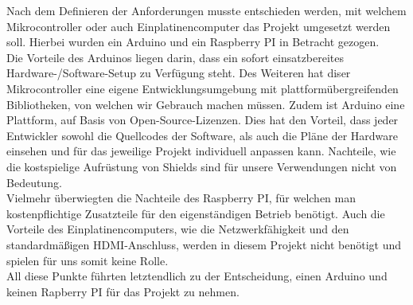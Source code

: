 \label{arduinovsRasbPI}

Nach dem Definieren der Anforderungen musste entschieden werden, mit welchem Mikrocontroller oder auch Einplatinencomputer das Projekt umgesetzt werden soll. Hierbei wurden ein Arduino und ein Raspberry PI in Betracht gezogen. \\
Die Vorteile des Arduinos liegen darin, dass ein sofort einsatzbereites Hardware-/Software-Setup zu Verfügung steht. Des Weiteren hat diser Mikrocontroller eine eigene Entwicklungsumgebung mit plattformübergreifenden Bibliotheken, von welchen wir Gebrauch machen müssen. Zudem ist Arduino eine Plattform, auf Basis von Open-Source-Lizenzen. Dies hat den Vorteil, dass jeder Entwickler sowohl die Quellcodes der Software, als auch die Pläne der Hardware einsehen und für das jeweilige Projekt individuell anpassen kann. \cite[vgl.]{MircoLang.2018} Nachteile, wie die kostspielige Aufrüstung von Shields sind für unsere Verwendungen nicht von Bedeutung. \\
Vielmehr überwiegten die Nachteile des Raspberry PI, für welchen man kostenpflichtige Zusatzteile für den eigenständigen Betrieb benötigt. Auch die Vorteile des Einplatinencomputers, wie die Netzwerkfähigkeit und den standardmäßigen \ac{HDMI}-Anschluss, werden in diesem Projekt nicht benötigt und spielen für uns somit keine Rolle. \cite[vgl.]{IONOS.2018} \\
All diese Punkte führten letztendlich zu der Entscheidung, einen Arduino und keinen Rapberry PI für das Projekt zu nehmen. \\
